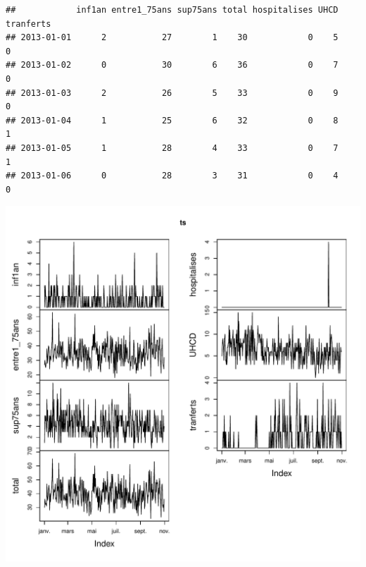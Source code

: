 \documentclass[12pt,english,french,twoside]{report}\usepackage[]{graphicx}\usepackage[]{color}
\makeatletter
\def\maxwidth{ %
  \ifdim\Gin@nat@width>\linewidth
    \linewidth
  \else
    \Gin@nat@width
  \fi
}
\newenvironment{kframe}{%
 \def\at@end@of@kframe{}%
 \ifinner\ifhmode%
  \def\at@end@of@kframe{\end{minipage}}%
  \begin{minipage}{\columnwidth}%
 \fi\fi%
 \def\FrameCommand##1{\hskip\@totalleftmargin \hskip-\fboxsep
 \colorbox{shadecolor}{##1}\hskip-\fboxsep
     \hskip-\linewidth \hskip-\@totalleftmargin \hskip\columnwidth}%
 \MakeFramed {\advance\hsize-\width
   \@totalleftmargin\z@ \linewidth\hsize
   \@setminipage}}%
 {\par\unskip\endMakeFramed%
 \at@end@of@kframe}
\newenvironment{knitrout}{}{} %
\makeatother
\begin{document}
\begin{knitrout}
\color{fgcolor}\begin{kframe}
\begin{verbatim}
##            inf1an entre1_75ans sup75ans total hospitalises UHCD tranferts
## 2013-01-01      2           27        1    30            0    5         0
## 2013-01-02      0           30        6    36            0    7         0
## 2013-01-03      2           26        5    33            0    9         0
## 2013-01-04      1           25        6    32            0    8         1
## 2013-01-05      1           28        4    33            0    7         1
## 2013-01-06      0           28        3    31            0    4         0
\end{verbatim}
\end{kframe}
\includegraphics[width=\maxwidth]{figure/stAnne_tx_moyen_passages1} 
\begin{kframe}


\end{kframe}
\end{knitrout}
\end{document}
